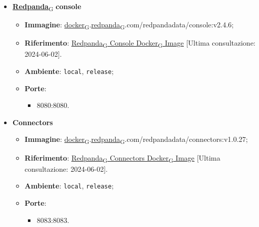 \begin{itemize}
	\item \href{https://7last.github.io/docs/pb/documentazione-interna/glossario\#redpanda}{\textbf{Redpanda}\textsubscript{G}}\textbf{ console}
	      \begin{itemize}
		      \item \textbf{Immagine}: \href{https://7last.github.io/docs/pb/documentazione-interna/glossario\#docker}{docker\textsubscript{G}}.\href{https://7last.github.io/docs/pb/documentazione-interna/glossario\#redpanda}{redpanda\textsubscript{G}}.com/redpandadata/console:v2.4.6;
		      \item \textbf{Riferimento}: \underline{\href{https://hub.docker.com/r/redpandadata/redpanda}{\href{https://7last.github.io/docs/pb/documentazione-interna/glossario\#redpanda}{Redpanda\textsubscript{G}} Console \href{https://7last.github.io/docs/pb/documentazione-interna/glossario\#docker}{Docker\textsubscript{G}} Image}} [Ultima consultazione: 2024-06-02].
		      \item \textbf{Ambiente}: \texttt{local}, \texttt{release};
		      \item \textbf{Porte}:
		            \begin{itemize}
			            \item 8080:8080.
		            \end{itemize}
	      \end{itemize}

	\item \textbf{Connectors}
	      \begin{itemize}
		      \item \textbf{Immagine}: \href{https://7last.github.io/docs/pb/documentazione-interna/glossario\#docker}{docker\textsubscript{G}}.\href{https://7last.github.io/docs/pb/documentazione-interna/glossario\#redpanda}{redpanda\textsubscript{G}}.com/redpandadata/connectors:v1.0.27;
		      \item \textbf{Riferimento}: \underline{\href{https://hub.docker.com/r/redpandadata/connectors}{\href{https://7last.github.io/docs/pb/documentazione-interna/glossario\#redpanda}{Redpanda\textsubscript{G}} Connectors \href{https://7last.github.io/docs/pb/documentazione-interna/glossario\#docker}{Docker\textsubscript{G}} Image}} [Ultima consultazione: 2024-06-02].
		      \item \textbf{Ambiente}: \texttt{local}, \texttt{release};
		      \item \textbf{Porte}:
		            \begin{itemize}
			            \item 8083:8083.
		            \end{itemize}
	      \end{itemize}


\end{itemize}
